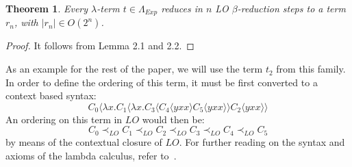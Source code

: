\documentclass[11pt]{article}
\newtheorem{theorem}{Theorem}[section]
\begin{document}
\begin{theorem}
Every $\lambda$-term $t \in \Lambda_{Exp}$ reduces in $n$ LO $\beta$-reduction steps to a term $r_n$, with $|r_n| \in O(2^n)$.
\end{theorem}
\begin{proof}
It follows from Lemma 2.1 and 2.2.
\end{proof}

As an example for the rest of the paper, we will use the term $t_{2}$ from this family. In order to define the ordering of this term, it must be first converted to a context based syntax:
\[ C_{0} \langle \lambda x. C_{1} \langle \lambda x. C_{3} \langle C_{4} \langle yxx \rangle C_{5} \langle yxx \rangle \rangle C_{2} \langle yxx \rangle \rangle \]
An ordering on this term in $LO$ would then be:
\begin{equation}
 C_{0} \prec_{LO} C_{1} \prec_{LO} C_{2} \prec_{LO} C_{3} \prec_{LO} C_{4} \prec_{LO} C_{5}
\end{equation}
by means of the contextual closure of $LO$.
For further reading on the syntax and axioms of the lambda calculus, refer to~\cite{barendregt1984lambda}.
\end{document}
